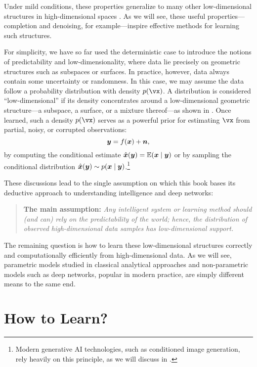 \documentclass[../../book-main.tex]{subfiles}
\begin{document}
Under mild conditions, these properties generalize to many other low-dimensional structures in high-dimensional spaces \cite{Wright-Ma-2022}. As we will see, these useful properties---completion and denoising, for example---inspire effective methods for learning such structures.

For simplicity, we have so far used the deterministic case to introduce the notions of predictability and low-dimensionality, where data lie precisely on geometric structures such as subspaces or surfaces. In practice, however, data always contain some uncertainty or randomness. In this case, we may assume the data follow a probability distribution with density $p(\vx)$. A distribution is considered ``low-dimensional'' if its density concentrates around a low-dimensional geometric structure---a subspace, a surface, or a mixture thereof---as shown in . Once learned, such a density $p(\vx)$ serves as a powerful prior for estimating $\vx$ from partial, noisy, or corrupted observations:
\begin{equation}
\bm{y} = f(\bm{x}) + \boldsymbol{n},
\end{equation}
by computing the conditional estimate $\hat{\bm{x}}(\bm{y}) = \mathbb{E}(\bm{x} \mid \bm{y})$ or by sampling the conditional distribution $\hat{\bm{x}}(\bm{y}) \sim p(\bm{x}\mid \bm{y})$.\footnote{Modern generative AI technologies, such as conditioned image generation, rely heavily on this principle, as we will discuss in .}

These discussions lead to the single assumption on which this book bases its deductive approach to understanding intelligence and deep networks:
\begin{quote}
\textbf{The main assumption:} \textit{Any intelligent system or learning method should (and can) rely on the predictability of the world; hence, the distribution of observed high-dimensional data samples has low-dimensional support.}
\end{quote}
The remaining question is how to learn these low-dimensional structures correctly and computationally efficiently from high-dimensional data. As we will see, parametric models studied in classical analytical approaches and non-parametric models such as deep networks, popular in modern practice, are simply different means to the same end.

\section{How to Learn?}
\end{document}
